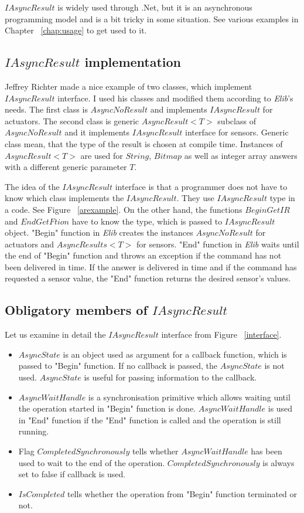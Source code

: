   $IAsyncResult$ is widely used through .Net, but it is an asynchronous programming model
  and is a bit tricky in some situation. See various examples in Chapter ~\ref{chap:usage} 
  to get used to it.

\subsection{$IAsyncResult$ implementation} \label{sec:iasyncimpl}
  Jeffrey Richter \cite{IAsync} made a nice example of two classes, which implement $IAsyncResult$ interface.
  I used his classes and modified them according to {\it Elib}'s needs.
  The first class is $AsyncNoResult$ and implements $IAsyncResult$ for actuators.
  The second class is generic $AsyncResult<T>$ subclass of $AsyncNoResult$ and 
  it implements $IAsyncResult$ interface for sensors.
  Generic class mean, that the type of the result is chosen at compile time. %
  Instances of $AsyncResult<T>$ are used
  for $String$, $Bitmap$ as well as integer array answers with a different generic parameter $T$.
  
  The idea of the $IAsyncResult$ interface is that a programmer does not have to know which
  class implements the $IAsyncResult$. They use $IAsyncResult$ type in a code. See Figure ~\ref{arexample}. 
  On the other hand, the functions $BeginGetIR$ and $EndGetFtion$ have to know the type, which is passed to $IAsyncResult$ object.
  "Begin" function in {\it Elib} creates the instances $AsyncNoResult$ for actuators and $AsyncResults<T>$ for sensors.
  "End" function in {\it Elib} waits until the end of "Begin" function and 
  throws an exception if the command has not been delivered in time.
  If the answer is delivered in time and if the command has requested a sensor value, 
  the "End" function returns the desired sensor's values.
  
\subsection*{Obligatory members of $IAsyncResult$} \label{sec:iasyncmemb}
  Let us examine in detail the $IAsyncResult$ interface from Figure ~\ref{interface}. 
  \begin{itemize}
  \item $AsyncState$ is an object used as argument for a callback function, which
  is passed to "Begin" function. If no callback is passed, the $AsyncState$ is not used. 
  $AsyncState$ is useful for passing information to the callback.
  \item $AsyncWaitHandle$ is a synchronisation primitive which allows waiting until the operation 
  started in "Begin" function is done.
  $AsyncWaitHandle$ is used in "End" function if the "End" function is called 
  and the operation is still running. 
  \item Flag $CompletedSynchronously$ tells whether  
  $AsyncWaitHandle$ has been used to wait to the end of the operation.
  $CompletedSynchronously$ is always set to false if callback is used.
  \item $IsCompleted$ tells whether the operation from "Begin" function terminated or not.
  \end{itemize}

